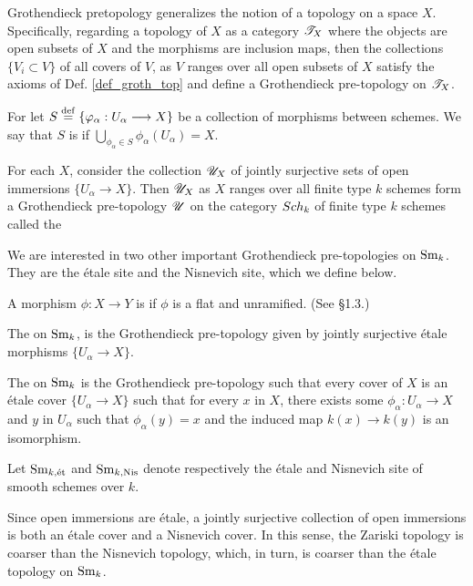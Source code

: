 \begin{rmk}
Grothendieck pretopology generalizes the notion of a topology on
a space $X$. Specifically, regarding a topology of $X$ as a 
category $\mathscr{T}_X$ where the objects are open subsets of $X$ and 
the morphisms are inclusion maps, then the collections $\{V_i 
\subset V\}$ of all covers of $V$, as $V$ ranges over all open 
subsets of $X$ satisfy the axioms of Def. \ref{def_groth_top} and 
define a Grothendieck pre-topology on $\mathscr{T}_X$.
\end{rmk}

\begin{defn}
For let $S \stackrel{\mathrm{def}}{=} \{\varphi_\alpha: U_\alpha \longrightarrow X\}$ be a collection 
of morphisms between schemes. We say that $S$ is  if $\bigcup_{\phi_\alpha \in S} \phi_\alpha(U_\alpha)
= X$.
\end{defn}

\begin{rmk}
For each $X$, consider the collection $\mathscr{U}_X$ of jointly 
surjective sets of open immersions $\{U_\alpha \to X\}$. Then
$\mathscr{U}_X$ as $X$ ranges over all finite type $k$ schemes 
form a Grothendieck pre-topology $\mathscr{U}$ on the category 
$Sch_k$ of finite type $k$ schemes called the 
\end{rmk}

We are interested in two other important Grothendieck 
pre-topologies on $\mathrm{Sm}_{k}$. They are the \'etale site and the 
Nisnevich site, which we define below.

\begin{defn}
A morphism $\phi: X \to Y$ is  if $\phi$ is a flat
and unramified. (See \cite{Milne} \S 1.3.)

The  on $\mathrm{Sm}_{k}$, is the Grothendieck 
pre-topology given by jointly surjective \'etale morphisms 
$\{U_\alpha \to X\}.$

The  on $\mathrm{Sm}_{k}$ is the Grothendieck 
pre-topology such that every cover of $X$ is an \'etale cover 
$\{U_\alpha \to X\}$ such that for every $x$ in $X$, there exists 
some $\phi_\alpha: U_\alpha \to X$ and $y$ in $U_\alpha$ such that 
$\phi_\alpha(y) = x$ and the induced map $k(x) \to k(y)$ is an 
isomorphism.

Let $\mathrm{Sm}_{k,\mathrm{\acute{e}t}}$ and $\mathrm{Sm}_{k, \mathrm{Nis}}$ denote respectively the \'etale 
and Nisnevich site of smooth schemes over $k$.
\end{defn}

\begin{rmk}\label{rmk_comp_of_tops}
Since open immersions are \'etale, a jointly surjective collection 
of open immersions is both an \'etale cover and a Nisnevich cover. 
In this sense, the Zariski topology is coarser than the Nisnevich 
topology, which, in turn, is coarser than the \'etale topology
on $\mathrm{Sm}_{k}$.
\end{rmk}

